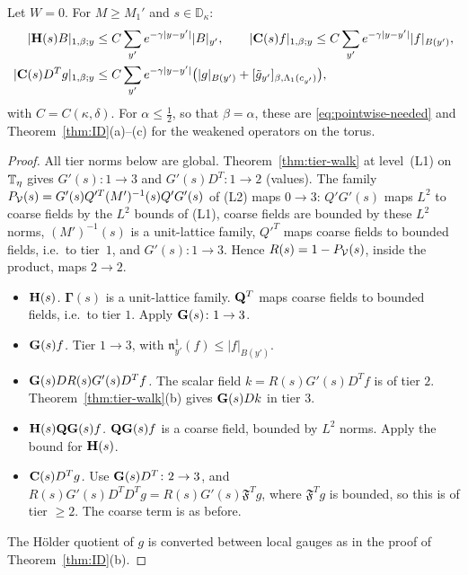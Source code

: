 \begin{theorem}\label{thm:HC-pointwise}
Let $W=0$. For $M\ge M_1'$ and $s\in\mathbb D_\kappa$:
\[
\begin{aligned}
|\mathbf H(s)B|_{1,\beta;y}&\le C\sum_{y'}e^{-\gamma|y-y'|}|B|_{y'},\qquad|\mathbf C(s)f|_{1,\beta;y}\le C\sum_{y'}e^{-\gamma|y-y'|}|f|_{B(y')},\\
|\mathbf C(s)D^Tg|_{1,\beta;y}&\le C\sum_{y'}e^{-\gamma|y-y'|}\big(|g|_{B(y')}+[\tilde g_{y'}]_{\beta,\Lambda_1(c_{y'})}\big),
\end{aligned}
\]
with $C=C(\kappa,\delta)$. For $\alpha\le\frac12$, so that $\beta=\alpha$, these are \eqref{eq:pointwise-needed} and Theorem~\ref{thm:ID}(a)--(c) for the weakened operators on the torus.
\end{theorem}

\begin{proof}
All tier norms below are global. Theorem~\ref{thm:tier-walk} at level~(L1) on $\mathbb T_\eta$ gives $G'(s)\colon1\to3$ and $G'(s)D^T\colon1\to2$ (values). The family $P_\mathcal V(s)=G'(s)Q'^T(M')^{-1}(s)Q'G'(s)$ of (L2) maps $0\to3$: $Q'G'(s)$ maps $L^2$ to coarse fields by the $L^2$ bounds of (L1), coarse fields are bounded by these $L^2$ norms, $(M')^{-1}(s)$ is a unit-lattice family, $Q'^T$ maps coarse fields to bounded fields, i.e.\ to tier~$1$, and $G'(s)\colon1\to3$. Hence $R(s)=1-P_\mathcal V(s)$, inside the product, maps $2\to2$.
\begin{itemize}
\item \emph{$\mathbf H(s)$.} $\boldsymbol\Gamma(s)$ is a unit-lattice family. $\mathbf Q^T$ maps coarse fields to bounded fields, i.e.\ to tier $1$. Apply $\mathbf G(s)\colon1\to3$.
\item \emph{$\mathbf G(s)f$.} Tier $1\to3$, with $\mathfrak n^1_{y'}(f)\le|f|_{B(y')}$.
\item \emph{$\mathbf G(s)DR(s)G'(s)D^Tf$.} The scalar field $k=R(s)G'(s)D^Tf$ is of tier $2$. Theorem~\ref{thm:tier-walk}(b) gives $\mathbf G(s)Dk$ in tier $3$.
\item \emph{$\mathbf H(s)\mathbf Q\mathbf G(s)f$.} $\mathbf Q\mathbf G(s)f$ is a coarse field, bounded by $L^2$ norms. Apply the bound for $\mathbf H(s)$.
\item \emph{$\mathbf C(s)D^Tg$.} Use $\mathbf G(s)D^T\colon2\to3$, and $R(s)G'(s)D^TD^Tg=R(s)G'(s)\mathfrak F^Tg$, where $\mathfrak F^Tg$ is bounded, so this is of tier $\ge2$. The coarse term is as before.
\end{itemize}
The H\"older quotient of $g$ is converted between local gauges as in the proof of Theorem~\ref{thm:ID}(b).
\end{proof}

